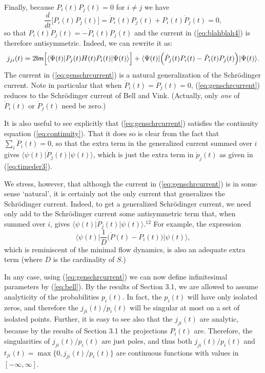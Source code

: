 \documentclass[12pt]{article}
\newcommand{\be}{\begin{equation}}
\newcommand{\ee}{\end{equation}}
\renewcommand{\Im}{\mbox{{\sf Im}}}                             %
\newcommand{\bra}[1]{\langle #1\vert}                           %
\newcommand{\ket}[1]{\vert #1\rangle}                           %
\begin{document}
Finally, because $P_i(t)P_j(t) = 0$ for $i \neq j$ we have
\be
  \frac{d}{dt} \Big[ P_i(t)P_j(t) \Big]
   = \dot{P}_i(t)P_j(t) + P_i(t)\dot{P}_j(t) = 0,
\ee
so that $P_i(t)\dot{P}_j(t) = - \dot{P}_i(t)P_j(t)$ and the current
in (\ref{eq:blahblah4}) is therefore antisymmetric.  Indeed, we can
rewrite it as:
\be
  \label{eq:genschrcurrent}
  j_{ji}(t) = 2 \Im \Big[ \bra{\Psi(t)} P_j(t) H(t) P_i(t) 
  \ket{\Psi(t)} \Big] + \bra{\Psi(t)}\Big( \dot{P}_j(t)P_i(t) - 
  \dot{P}_i(t)P_j(t) \Big) \ket{\Psi(t)}.
\ee
The current in (\ref{eq:genschrcurrent}) is a natural generalization
of the Schr\"odinger current.  Note in particular that when
$\dot{P}_i(t) = \dot{P}_j(t) = 0$, (\ref{eq:genschrcurrent}) reduces
to the Schr\"odinger current of Bell and Vink.  (Actually, only {\it
one} of $\dot{P}_{i}(t)$ or $\dot{P}_{j}(t)$ need be zero.)

It is also useful to see explicitly that (\ref{eq:genschrcurrent}) 
satisfies the continuity equation (\ref{eq:continuity}).  That it does 
so is clear from the fact that $\sum_i \dot{P}_i(t) = 0$, so that the 
extra term in the generalized current summed over $i$ gives 
$\bra{\psi(t)}\dot{P}_j(t)\ket{\psi(t)}$, which is just the extra term 
in $\dot{p}_j(t)$ as given in (\ref{eq:timeder3}).

We stress, however, that although the current in 
(\ref{eq:genschrcurrent}) is in some sense `natural', it is certainly 
not the only current that generalizes the Schr\"odinger current.  
Indeed, to get a generalized Schr\"odinger current, we need only add 
to the Schr\"odinger current some antisymmetric term that, when summed 
over $i$, gives $\bra{\psi(t)}\dot{P}_j(t)\ket{\psi(t)}$.$^{12}$ For 
example, the expression
\be
  \bra{\psi(t)}\frac{1}{D} \Big( \dot{P}(t) - \dot{P}_i(t) 
  \Big)\ket{\psi(t)},
\ee
which is reminiscent of the minimal flow dynamics, is also an adequate
extra term (where $D$ is the cardinality of $S$.)

In any case, using (\ref{eq:genschrcurrent}) we can now define 
infinitesimal parameters by (\ref{eq:bell}).  By the results of 
Section 3.1, we are allowed to assume analyticity of the probabilities 
$p_i(t)$.  In fact, the $p_i(t)$ will have only isolated zeros, and 
therefore the $j_{ji}(t)/p_i(t)$ will be singular at most on a set of 
isolated points.  Further, it is easy to see also that the $j_{ji}(t)$ 
are analytic, because by the results of Section 3.1 the projections 
$P_i(t)$ are.  Therefore, the singularities of $j_{ji}(t)/p_i(t)$ are 
just poles, and thus both $j_{ji}(t)/p_i(t)$ and 
$t_{ji}(t)=\max\{0,j_{ji}(t)/p_i(t)\}$ are continuous functions with 
values in $[-\infty,\infty]$.
\end{document}

